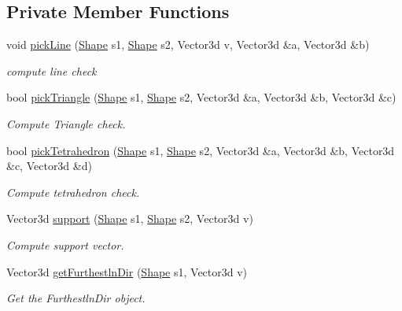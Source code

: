 \subsection*{Private Member Functions}
\begin{DoxyCompactItemize}
\item 
void \hyperlink{classGJK_aba173ffe2b0fc0fb5f2bca0bbe5177ef}{pick\+Line} (\hyperlink{structShape}{Shape} s1, \hyperlink{structShape}{Shape} s2, Vector3d v, Vector3d \&a, Vector3d \&b)
\begin{DoxyCompactList}\small\item\em compute line check \end{DoxyCompactList}\item 
bool \hyperlink{classGJK_a7e843858e96f401c08a97f40171fab0d}{pick\+Triangle} (\hyperlink{structShape}{Shape} s1, \hyperlink{structShape}{Shape} s2, Vector3d \&a, Vector3d \&b, Vector3d \&c)
\begin{DoxyCompactList}\small\item\em Compute Triangle check. \end{DoxyCompactList}\item 
bool \hyperlink{classGJK_a17f529ee6a7ef8fdfd01062523bb97fa}{pick\+Tetrahedron} (\hyperlink{structShape}{Shape} s1, \hyperlink{structShape}{Shape} s2, Vector3d \&a, Vector3d \&b, Vector3d \&c, Vector3d \&d)
\begin{DoxyCompactList}\small\item\em Compute tetrahedron check. \end{DoxyCompactList}\item 
Vector3d \hyperlink{classGJK_abf05bc7c7c1f39f72d582e9eeab5226d}{support} (\hyperlink{structShape}{Shape} s1, \hyperlink{structShape}{Shape} s2, Vector3d v)
\begin{DoxyCompactList}\small\item\em Compute support vector. \end{DoxyCompactList}\item 
Vector3d \hyperlink{classGJK_af4aea563d6d864cc85fafa050a8510eb}{get\+Furthestln\+Dir} (\hyperlink{structShape}{Shape} s1, Vector3d v)
\begin{DoxyCompactList}\small\item\em Get the Furthestln\+Dir object. \end{DoxyCompactList}\end{DoxyCompactItemize}

